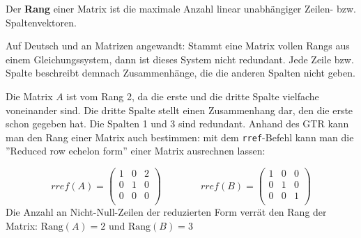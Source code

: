 \documentclass[main.tex]{subfiles}
\begin{document}
\begin{Definition}
    Der \textbf{Rang} einer Matrix ist die maximale Anzahl linear unabhängiger Zeilen- bzw. Spaltenvektoren. 
    
    Auf Deutsch und an Matrizen angewandt: Stammt eine Matrix vollen Rangs aus einem Gleichungssystem, dann ist dieses System nicht redundant. Jede Zeile bzw. Spalte beschreibt demnach Zusammenhänge, die die anderen Spalten nicht geben. 
\end{Definition}

\begin{Beispiel}

    Die Matrix $A$ ist vom Rang 2, da die erste und die dritte Spalte vielfache voneinander sind. Die dritte Spalte stellt einen Zusammenhang dar, den die erste schon gegeben hat. Die Spalten 1 und 3 sind redundant. Anhand des GTR kann man den Rang einer Matrix auch bestimmen: mit dem \texttt{rref}-Befehl kann man die ''Reduced row echelon form'' einer Matrix ausrechnen lassen:

    $$rref(A) = 
    \begin{pmatrix} 
    1&0&2\\ 
    0&1&0\\ 
    0&0&0\\  
    \end{pmatrix} \qquad \qquad
    rref(B) = 
    \begin{pmatrix} 
    1&0&0\\ 
    0&1&0\\ 
    0&0&1\\  
    \end{pmatrix}$$
    Die Anzahl an Nicht-Null-Zeilen der reduzierten Form verrät den Rang der Matrix: $\text{Rang}(A) = 2$  und $\text{Rang}(B) = 3$
\end{Beispiel}
\end{document}
